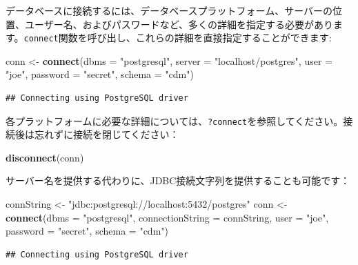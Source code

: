 \documentclass[
  11pt]{book}
\newenvironment{Shaded}{\begin{snugshade}}{\end{snugshade}}
\newcommand{\AttributeTok}[1]{\textcolor[rgb]{0.13,0.29,0.53}{#1}}
\newcommand{\FunctionTok}[1]{\textcolor[rgb]{0.13,0.29,0.53}{\textbf{#1}}}
\newcommand{\NormalTok}[1]{#1}
\newcommand{\OtherTok}[1]{\textcolor[rgb]{0.56,0.35,0.01}{#1}}
\newcommand{\StringTok}[1]{\textcolor[rgb]{0.31,0.60,0.02}{#1}}
\theoremstyle{definition}
\theoremstyle{definition}
\theoremstyle{definition}
\theoremstyle{definition}
\theoremstyle{remark}
\begin{document}
データベースに接続するには、データベースプラットフォーム、サーバーの位置、ユーザー名、およびパスワードなど、多くの詳細を指定する必要があります。\texttt{connect}関数を呼び出し、これらの詳細を直接指定することができます: 

\begin{Shaded}
\begin{Highlighting}[]
\NormalTok{conn }\OtherTok{\textless{}{-}} \FunctionTok{connect}\NormalTok{(}\AttributeTok{dbms =} \StringTok{"postgresql"}\NormalTok{,}
                \AttributeTok{server =} \StringTok{"localhost/postgres"}\NormalTok{,}
                \AttributeTok{user =} \StringTok{"joe"}\NormalTok{,}
                \AttributeTok{password =} \StringTok{"secret"}\NormalTok{,}
                \AttributeTok{schema =} \StringTok{"cdm"}\NormalTok{)}
\end{Highlighting}
\end{Shaded}

\begin{verbatim}
## Connecting using PostgreSQL driver
\end{verbatim}

各プラットフォームに必要な詳細については、\texttt{?connect}を参照してください。接続後は忘れずに接続を閉じてください：

\begin{Shaded}
\begin{Highlighting}[]
\FunctionTok{disconnect}\NormalTok{(conn)}
\end{Highlighting}
\end{Shaded}

サーバー名を提供する代わりに、JDBC接続文字列を提供することも可能です：

\begin{Shaded}
\begin{Highlighting}[]
\NormalTok{connString }\OtherTok{\textless{}{-}} \StringTok{"jdbc:postgresql://localhost:5432/postgres"}
\NormalTok{conn }\OtherTok{\textless{}{-}} \FunctionTok{connect}\NormalTok{(}\AttributeTok{dbms =} \StringTok{"postgresql"}\NormalTok{,}
                \AttributeTok{connectionString =}\NormalTok{ connString,}
                \AttributeTok{user =} \StringTok{"joe"}\NormalTok{,}
                \AttributeTok{password =} \StringTok{"secret"}\NormalTok{,}
                \AttributeTok{schema =} \StringTok{"cdm"}\NormalTok{)}
\end{Highlighting}
\end{Shaded}

\begin{verbatim}
## Connecting using PostgreSQL driver
\end{verbatim}
\end{document}
